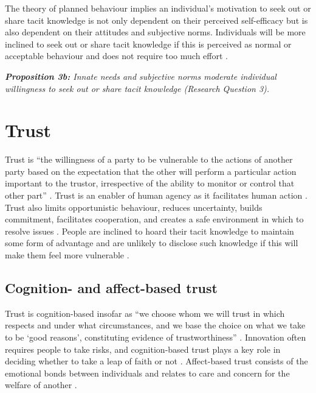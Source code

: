 The theory of planned behaviour implies an individual's motivation to seek out or share tacit knowledge is not only dependent on their perceived self-efficacy but is also dependent on their attitudes and subjective norms. Individuals will be more inclined to seek out or share tacit knowledge if this is perceived as normal or acceptable behaviour and does not require too much effort \citep{gagne2009model,chen2012behavioral}. \bigskip

\begin{tcolorbox}
\textit{\textbf{Proposition 3b:} Innate needs and subjective norms moderate individual willingness to seek out or share tacit knowledge (Research Question 3).}
\end{tcolorbox}

\section{Trust}

Trust is \enquote{the willingness of a party to be vulnerable to the actions of another party based on the expectation that the other will perform a particular action important to the trustor, irrespective of the ability to monitor or control that other part} \citep{mayer1995integrative}. 
Trust is an enabler of human agency as it facilitates human action \citep{muller2008living,mcevily2011measuring}. Trust also limits opportunistic behaviour, reduces uncertainty, builds commitment, facilitates cooperation, and creates a safe environment in which to resolve issues \citep{nonaka1994dynamic,panteli2005trust,rasmussen2007work}. People are inclined to hoard their tacit knowledge to maintain some form of advantage and are unlikely to disclose such knowledge if this will make them feel more vulnerable  \citep{levin2004strength,riege2005three,lin2007share,milne2007motivation}. 

\subsection{Cognition- and affect\hyp{}based trust}

Trust is cognition-based insofar as \enquote{we choose whom we will trust in which respects and under what circumstances, and we base the choice on what we take to be \enquote{good reasons}, constituting evidence of trustworthiness} \citep{lewis1985trust}. Innovation often requires people to take risks, and cognition\hyp{}based trust plays a key role in deciding whether to take a leap of faith or not \citep{mcevily2011measuring}. Affect-based trust consists of the emotional bonds between individuals and relates to care and concern for the welfare of another \citep{mcallister1995affect}. \medskip

